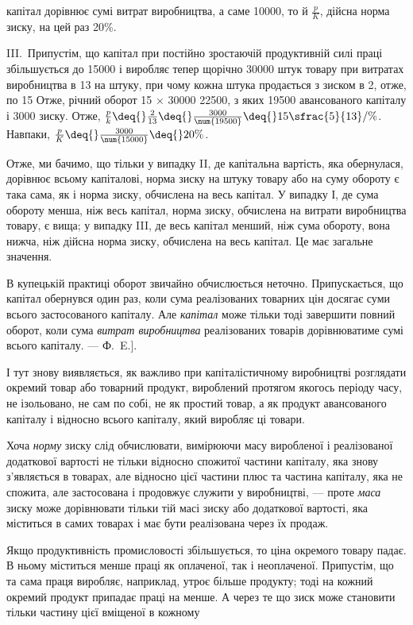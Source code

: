 \parcont{}  %
капітал дорівнює сумі витрат виробництва, а саме \num{10000}, то й $\frac{p}{K}$, дійсна норма
зиску, на цей раз \deq{} 20\%.

III.~Припустім, що капітал при постійно зростаючій продуктивній силі праці збільшується до \num{15000} і виробляє тепер щорічно \num{30000} штук товару при витратах виробництва в 13
на штуку, при чому кожна штука продається з зиском в 2, отже, по 15 Отже, річний
оборот \deq{} 15 × \num{30000} \deq{} \num{22500}, з яких \num{19500}
авансованого капіталу і 3000 зиску. Отже,
$\frac{p}{k} \deq{} \frac{2}{13} \deq{} \frac{3000}{\num{19500}} \deq{} 15\sfrac{5}{13}/\%$.
Навпаки, $\frac{p}{K} \deq{} \frac{3000}{\num{15000}} \deq{} 20\%$.

Отже, ми бачимо, що тільки у випадку II, де капітальна вартість, яка обернулася, дорівнює всьому
капіталові, норма зиску на штуку товару або на суму обороту є така сама, як і норма зиску, обчислена
на весь капітал. У випадку І, де сума обороту менша, ніж весь капітал, норма зиску, обчислена на
витрати виробництва товару, є вища; у випадку III, де весь капітал менший, ніж сума обороту, вона
нижча, ніж дійсна норма зиску, обчислена на весь капітал. Це має загальне значення.

В купецькій практиці оборот звичайно обчислюється неточно. Припускається, що капітал обернувся один
раз, коли сума реалізованих товарних цін досягає суми всього застосованого капіталу. Але \emph{капітал}
може тільки тоді завершити повний оборот, коли сума \emph{витрат виробництва} реалізованих товарів
дорівнюватиме сумі всього капіталу. — Ф.~E.].

І тут знову виявляється, як важливо при капіталістичному виробництві розглядати окремий товар або
товарний продукт, вироблений протягом якогось періоду часу, не ізольовано, не сам по собі, не як
простий товар, а як продукт авансованого капіталу і відносно всього капіталу, який виробляє ці
товари.

Хоча \emph{норму} зиску слід обчислювати, вимірюючи масу виробленої і реалізованої додаткової вартості не
тільки відносно спожитої частини капіталу, яка знову з’являється в товарах, але відносно цієї
частини плюс та частина капіталу, яка не спожита, але застосована і продовжує служити у виробництві,
— проте \emph{маса} зиску може дорівнювати тільки тій масі зиску або додаткової вартості, яка міститься в
самих товарах і має бути реалізована через їх продаж.

Якщо продуктивність промисловості збільшується, то ціна окремого товару падає. В ньому міститься
менше праці як оплаченої, так і неоплаченої. Припустім, що та сама праця виробляє, наприклад, утроє
більше продукту; тоді на кожний окремий продукт припадає праці на  менше. А через те що зиск
може становити тільки частину цієї вміщеної в кожному
\parbreak{}  %

